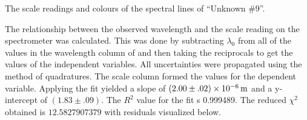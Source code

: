 \begin{paper}
{The scale readings and colours of the spectral lines of ``Unknown \#9''.}


The relationship between the observed wavelength and the
scale reading on the spectrometer was calculated.
This was done by subtracting $\lambda_0$ from all of the values in the wavelength column of
\figHelium and then taking the reciprocals to get the values of the independent
variables.
All uncertainties were propagated using the method of quadratures.
The scale column formed the values for the dependent variable.
Applying the fit yielded a slope of $(2.00\pm.02)\times\SI{E-6}{\meter}$ and a
y-intercept of $(1.83\pm.09)$.
The $R^2$ value for the fit s 0.999489.
The reduced $ \chi^2 $ obtained is $ 12.5827907379 $ with residuals visualized below.



\end{paper}
